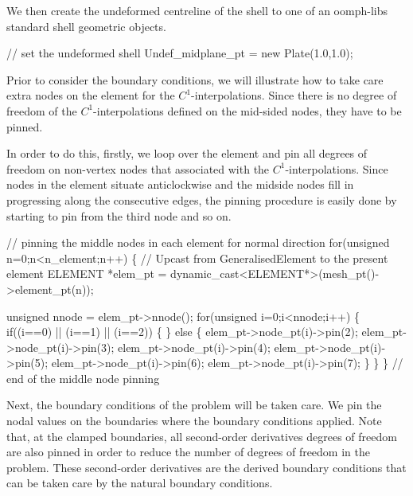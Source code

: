 We then create the undeformed centreline of the shell to one of an oomph-\/lib\textquotesingle{}s standard shell geometric objects.


\begin{DoxyCodeInclude}
 \textcolor{comment}{// set the undeformed shell}
 Undef\_midplane\_pt = \textcolor{keyword}{new} Plate(1.0,1.0);

\end{DoxyCodeInclude}


Prior to consider the boundary conditions, we will illustrate how to take care extra nodes on the element for the $ C^1 $-\/interpolations. Since there is no degree of freedom of the $ C^1 $-\/interpolations defined on the mid-\/sided nodes, they have to be pinned.

In order to do this, firstly, we loop over the element and pin all degrees of freedom on non-\/vertex nodes that associated with the $ C^1 $-\/interpolations. Since nodes in the element situate anticlockwise and the midside nodes fill in progressing along the consecutive edges, the pinning procedure is easily done by starting to pin from the third node and so on.


\begin{DoxyCodeInclude}
 \textcolor{comment}{// pinning the middle nodes in each element for normal direction}
 \textcolor{keywordflow}{for}(\textcolor{keywordtype}{unsigned} n=0;n<n\_element;n++)
 \{
  \textcolor{comment}{// Upcast from GeneralisedElement to the present element}
  ELEMENT *elem\_pt = \textcolor{keyword}{dynamic\_cast<}ELEMENT*\textcolor{keyword}{>}(mesh\_pt()->element\_pt(n));
   
  \textcolor{keywordtype}{unsigned} nnode = elem\_pt->nnode();
  \textcolor{keywordflow}{for}(\textcolor{keywordtype}{unsigned} i=0;i<nnode;i++)
   \{
    \textcolor{keywordflow}{if}((i==0) || (i==1) || (i==2))
     \{
     \}
    \textcolor{keywordflow}{else}
     \{
      elem\_pt->node\_pt(i)->pin(2);
      elem\_pt->node\_pt(i)->pin(3);
      elem\_pt->node\_pt(i)->pin(4);
      elem\_pt->node\_pt(i)->pin(5); 
      elem\_pt->node\_pt(i)->pin(6);
      elem\_pt->node\_pt(i)->pin(7);
     \}
   \}
 \} \textcolor{comment}{// end of the middle node pinning}

\end{DoxyCodeInclude}


Next, the boundary conditions of the problem will be taken care. We pin the nodal values on the boundaries where the boundary conditions applied. Note that, at the clamped boundaries, all second-\/order derivatives degrees of freedom are also pinned in order to reduce the number of degrees of freedom in the problem. These second-\/order derivatives are the derived boundary conditions that can be taken care by the natural boundary conditions.


